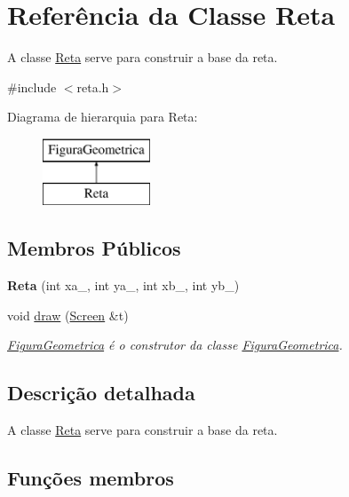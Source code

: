 \hypertarget{class_reta}{}\section{Referência da Classe Reta}
\label{class_reta}


A classe \mbox{\hyperlink{class_reta}{Reta}} serve para construir a base da reta.  




{\ttfamily \#include $<$reta.\+h$>$}

Diagrama de hierarquia para Reta\+:\begin{figure}[H]
\begin{center}
\leavevmode
\includegraphics[height=2.000000cm]{class_reta}
\end{center}
\end{figure}
\subsection*{Membros Públicos}
\begin{DoxyCompactItemize}
\item 
\mbox{\label{class_reta_a78ddb282fcaf38ff9cda2dc0f419cef2}} 
{\bfseries Reta} (int xa\+\_\+, int ya\+\_\+, int xb\+\_\+, int yb\+\_\+)
\item 
void \mbox{\hyperlink{class_reta_ac2e9805183cd474b62bffd8b032cd780}{draw}} (\mbox{\hyperlink{class_screen}{Screen}} \&t)
\begin{DoxyCompactList}\small\item\em \mbox{\hyperlink{class_figura_geometrica}{Figura\+Geometrica}} é o construtor da classe \mbox{\hyperlink{class_figura_geometrica}{Figura\+Geometrica}}. \end{DoxyCompactList}\end{DoxyCompactItemize}


\subsection{Descrição detalhada}
A classe \mbox{\hyperlink{class_reta}{Reta}} serve para construir a base da reta. 

\subsection{Funções membros}
\mbox{\label{class_reta_ac2e9805183cd474b62bffd8b032cd780}} 

